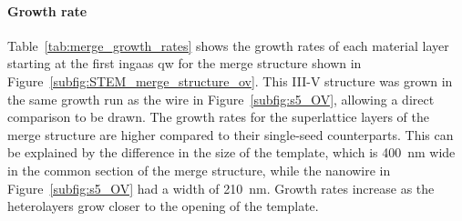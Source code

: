\paragraph{Growth rate} Table~\ref{tab:merge_growth_rates} shows the growth rates of each material layer starting at the first \acs{ingaas} \acl{qw} for the merge structure shown in Figure~\ref{subfig:STEM_merge_structure_ov}. This III-V structure was grown in the same growth run as the wire in Figure~\ref{subfig:s5_OV}, allowing a direct comparison to be drawn. The growth rates for the superlattice layers of the merge structure are higher compared to their single-seed counterparts. This can be explained by the difference in the size of the template, which is \qty{400}{\nano\metre} wide in the common section of the merge structure, while the nanowire in Figure~\ref{subfig:s5_OV} had a width of \qty{210}{\nano\metre}. Growth rates increase as the heterolayers grow closer to the opening of the template.

